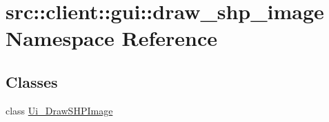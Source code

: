 \hypertarget{namespacesrc_1_1client_1_1gui_1_1draw__shp__image}{
\section{src::client::gui::draw\_\-shp\_\-image Namespace Reference}
\label{namespacesrc_1_1client_1_1gui_1_1draw__shp__image}
}
\subsection*{Classes}
\begin{DoxyCompactItemize}
\item 
class \hyperlink{classsrc_1_1client_1_1gui_1_1draw__shp__image_1_1Ui__DrawSHPImage}{Ui\_\-DrawSHPImage}
\end{DoxyCompactItemize}
